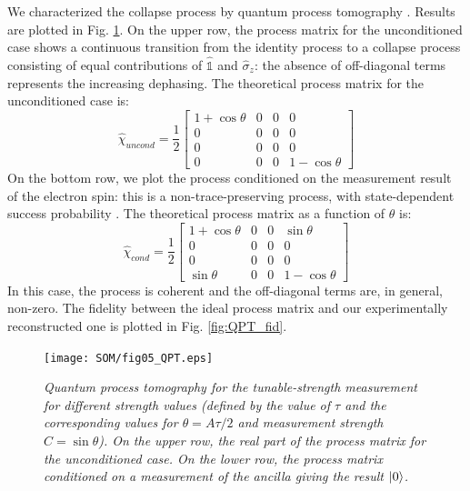 We characterized the collapse process by quantum process tomography \cite{Nielsen__2000}. Results are plotted in Fig. \ref{fig:QPT}. On the upper row, the process matrix for the unconditioned case shows a continuous transition from the identity process to a collapse process consisting of equal contributions of $\mathbb{\hat{1}}$ and $\hat{\sigma}_z$: the absence of off-diagonal terms represents the increasing dephasing. The theoretical process matrix for the unconditioned case is:
\begin{equation}
 \hat{\chi}_{uncond} = \frac{1}{2}
 \left[
\begin{array}{cccc}
1+\cos\theta & 0 & 0 & 0\\
0 & 0 & 0 & 0\\
0 & 0 & 0 & 0\\
0 & 0 & 0 & 1-\cos\theta
 \end{array}
 \right]
\end{equation}
On the bottom row, we plot the process conditioned on the measurement result of the electron spin: this is a non-trace-preserving process, with state-dependent success probability \cite{Bongioanni_Phys.Rev.A_2010}. The theoretical process matrix as a function of $\theta$ is:
\begin{equation}
\hat{\chi}_{cond} = \frac{1}{2}
 \left[
\begin{array}{cccc}
1+\cos\theta & 0 & 0 & \sin\theta\\
0 & 0 & 0 & 0\\
0 & 0 & 0 & 0\\
\sin\theta & 0 & 0 & 1-\cos\theta
 \end{array}
 \right]
\end{equation}
In this case, the process is coherent and the off-diagonal terms are, in general, non-zero. The fidelity between the ideal process matrix and our experimentally reconstructed one is plotted in Fig. \ref{fig:QPT_fid}.


\begin{figure} 
\centering
\texttt{[image: SOM/fig05\_QPT.eps]}
\caption{\textit{ Quantum process tomography for the tunable-strength measurement for different strength values (defined by the value of $\tau$ and the corresponding values for $\theta =  A \tau/2$ and measurement strength $C=\sin\theta$). On the upper row, the real part of the process matrix for the unconditioned case. On the lower row, the process matrix conditioned on a measurement of the ancilla giving the result $\left|0\right>$.}}
\label{fig:QPT}
\end{figure} 


